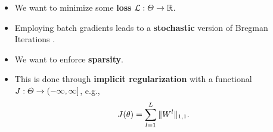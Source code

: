 {{\begin{minipage}[t]{\colwidth}
%
\begin{minipage}[t]{.48\textwidth}%
\vskip0pt%
\begin{itemize}%
\small%
\item We want to minimize some \textcolor{BaseDarkColor}{\textbf{loss}} $\mathcal{L}:\Theta\to\mathbb{R}$.
\item Employing batch gradients leads to a \textcolor{BaseDarkColor}{\textbf{stochastic}} version of Bregman Iterations \cite{yin2008bregman}.
\end{itemize}
\end{minipage}%
%
\hfill%
%
\begin{minipage}[t]{.48\textwidth}%
\vskip0pt%
\begin{itemize}%
\small%
\item We want to enforce \textcolor{BaseDarkColor}{\textbf{sparsity}}.
\phantom{Some much longer text.}
\item This is done through \textcolor{BaseDarkColor}{\textbf{implicit regularization}} with a functional $J:\Theta\to(-\infty,\infty]$, e.g.,
%
\vspace{5pt}
\begin{align*}
J(\theta) &= \sum_{l=1}^L \Vert W^l\Vert_{1,1}.
\end{align*}
\end{itemize}%
\end{minipage}%
\vspace{25pt}

%
\begin{minipage}[t]{\textwidth}%
\end{minipage}
\end{minipage}}}
